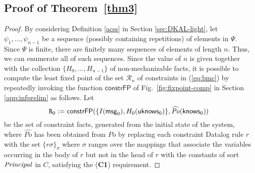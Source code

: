 \documentclass[conference]{llncs}
\newcommand{\know}{\ensuremath \mathsf{knows}}
\newcommand{\msg}{\ensuremath \mathsf{msg}}
\newcommand{\principal}{\ensuremath \mathit{Principal}}
\newcommand{\knowzero}{\ensuremath \mathsf{uknows}}
\begin{document}
{\subsection{Proof of Theorem~\ref{thm3} }
\label{proof}
\begin{proof}
  By considering Definition \ref{acss} in Section \ref{sec:DKAL-light}, let $\psi_1, ..., \psi_{n-1}$ be a sequence (possibly containing repetitions) of elements in $\Psi$.  Since $\Psi$ is finite, there
  are finitely many sequences of elements of length $n$. 
  Thus, we can enumerate all of such sequences.  
  Since the value of $n$ is given together with the collection $\{H_0, ..., H_{n-1}\}$ of
  non-mechanizable facts, it is possible to compute the least fixed point of the set
  $\mathcal{R}_n$ of constraints in (\ref{eq:bmc}) by repeatedly
  invoking the function $\mathsf{constrFP}$ of
  Fig.~\ref{fig:fixpoint-comp} in Section \ref{app:infprelim} as follows.  Let
  $$\mathtt{R}_0:=\mathsf{constrFP}(\{I(\msg_0), H_0(\knowzero_0)\}, \widehat{\mathit{Po}}(\know_0))$$ 
be the set of constraint facts, generated from the initial state of the system, 
  where $\widehat{\mathit{Po}}$ has been obtained from $\mathit{Po}$
  by replacing each constraint Datalog rule $r$ with the set
  $\{r\sigma\}_{\sigma}$ where $\sigma$ ranges over the mappings that
  associate the variables occurring in the body of $r$ but not in the
  head of $r$ with the constants of sort $\principal$ in $C$, 
  satisfying the (\textbf{C1}) requirement.



\end{proof}}
\end{document}
